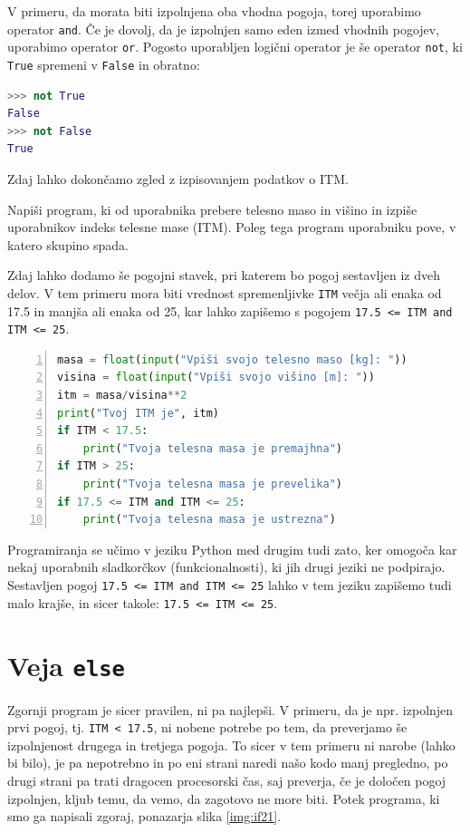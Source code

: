 V primeru, da morata biti izpolnjena oba vhodna pogoja, torej uporabimo operator \texttt{and}. Če je dovolj, da je izpolnjen samo eden izmed vhodnih pogojev, uporabimo operator \texttt{or}. Pogosto uporabljen logični operator je še operator \texttt{not}, ki \texttt{True} spremeni v \texttt{False} in obratno:
\begin{lstlisting}[language=Python, showstringspaces=false]
>>> not True
False
>>> not False
True
\end{lstlisting}

Zdaj lahko dokončamo zgled z izpisovanjem podatkov o ITM.
\begin{zgled}
Napiši program, ki od uporabnika prebere telesno maso in višino in izpiše uporabnikov indeks telesne mase (ITM). Poleg tega program uporabniku pove, v katero skupino spada. 
\end{zgled}
\begin{resitev}
Zdaj lahko dodamo še pogojni stavek, pri katerem bo pogoj sestavljen iz dveh delov. V tem primeru mora biti vrednost spremenljivke \texttt{ITM} večja ali enaka od 17.5 in manjša ali enaka od 25, kar lahko zapišemo s pogojem \texttt{17.5 <= ITM and ITM <= 25}.
\begin{lstlisting}[language=Python, showstringspaces=false,numbers=left]
masa = float(input("Vpiši svojo telesno maso [kg]: "))
visina = float(input("Vpiši svojo višino [m]: "))
itm = masa/visina**2
print("Tvoj ITM je", itm)
if ITM < 17.5:
    print("Tvoja telesna masa je premajhna")
if ITM > 25:
    print("Tvoja telesna masa je prevelika")
if 17.5 <= ITM and ITM <= 25:
    print("Tvoja telesna masa je ustrezna")
\end{lstlisting}
\end{resitev}

Programiranja se učimo v jeziku Python med drugim tudi zato, ker omogoča kar nekaj uporabnih sladkorčkov (funkcionalnosti), ki jih drugi jeziki ne podpirajo. Sestavljen pogoj \texttt{17.5 <= ITM and ITM <= 25} lahko v tem jeziku zapišemo tudi malo krajše, in sicer takole: \texttt{17.5 <= ITM <= 25}.

\section{Veja \texttt{else}}

Zgornji program je sicer pravilen, ni pa najlepši. V primeru, da je npr. izpolnjen prvi pogoj, tj. \texttt{ITM < 17.5}, ni nobene potrebe po tem, da preverjamo še izpolnjenost drugega in tretjega pogoja. To sicer v tem primeru ni narobe (lahko bi bilo), je pa nepotrebno in po eni strani naredi našo kodo manj pregledno, po drugi strani pa trati dragocen procesorski čas, saj preverja, če je določen pogoj izpolnjen, kljub temu, da vemo, da zagotovo ne more biti. Potek programa, ki smo ga napisali zgoraj, ponazarja slika \ref{img:if21}.

